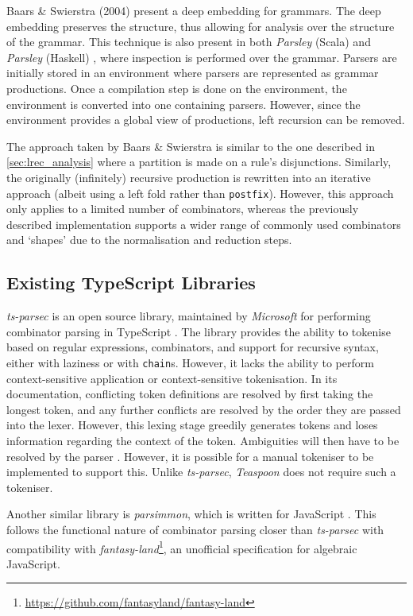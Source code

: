 Baars \& Swierstra (2004) \cite{baars04} present a deep embedding for grammars.
The deep embedding preserves the structure, thus allowing for analysis over the structure of the grammar.
This technique is also present in both \textit{Parsley} (Scala) \cite{willis18} and \textit{Parsley} (Haskell) \cite{willis20}, where inspection is performed over the grammar.
Parsers are initially stored in an environment where parsers are represented as grammar productions.
Once a compilation step is done on the environment, the environment is converted into one containing parsers.
However, since the environment provides a global view of productions, left recursion can be removed.

The approach taken by Baars \& Swierstra is similar to the one described in \autoref{sec:lrec_analysis} where a partition is made on a rule's disjunctions.
Similarly, the originally (infinitely) recursive production is rewritten into an iterative approach (albeit using a left fold rather than \texttt{postfix}).
However, this approach only applies to a limited number of combinators, whereas the previously described implementation supports a wider range of commonly used combinators and `shapes' due to the normalisation and reduction steps.

\subsection{Existing TypeScript Libraries}
\label{ssec:tslib}

\textit{ts-parsec} is an open source library, maintained by \textit{Microsoft} for performing combinator parsing in TypeScript \cite{tsparsec}.
The library provides the ability to tokenise based on regular expressions, combinators, and support for recursive syntax, either with laziness or with \texttt{chain}s.
However, it lacks the ability to perform context-sensitive application or context-sensitive tokenisation.
In its documentation, conflicting token definitions are resolved by first taking the longest token, and any further conflicts are resolved by the order they are passed into the lexer.
However, this lexing stage greedily generates tokens and loses information regarding the context of the token.
Ambiguities will then have to be resolved by the parser \cite{willis21}.
However, it is possible for a manual tokeniser to be implemented to support this.
Unlike \textit{ts-parsec}, \textit{Teaspoon} does not require such a tokeniser.

Another similar library is \textit{parsimmon}, which is written for JavaScript \cite{parsimmon}.
This follows the functional nature of combinator parsing closer than \textit{ts-parsec} with compatibility with \textit{fantasy-land}\footnote{\url{https://github.com/fantasyland/fantasy-land}}, an unofficial specification for algebraic JavaScript.

